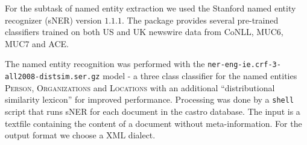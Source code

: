For the subtask of named entity extraction we used the Stanford named entity recognizer (sNER)
\cite{sner} version $1.1.1$. The package provides several pre-trained classifiers trained on both US
and UK newswire data from CoNLL, MUC6, MUC7 and ACE.

The named entity recognition was performed with the
\texttt{ner-eng-ie.crf-3-all2008-distsim.ser.gz} model - a three class classifier for the named
entities \textsc{Person}, \textsc{Organizations} and \textsc{Locations} with an additional
``distributional similarity lexicon'' for improved performance. Processing was done by a
\texttt{shell} script that runs sNER for each document in the castro database. The input is a
textfile containing the content of a document without meta-information. For the output format we
choose a XML dialect.

